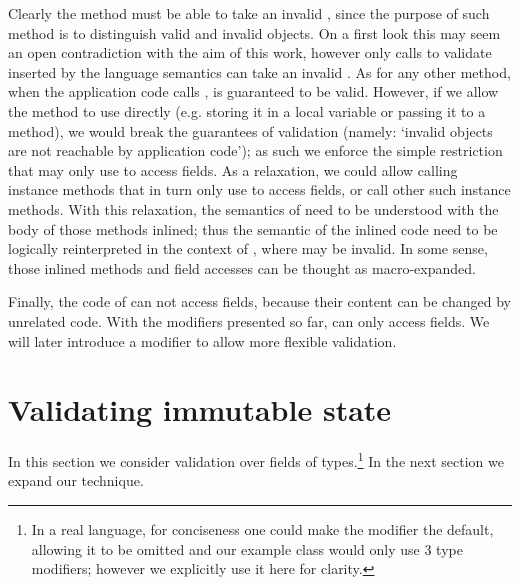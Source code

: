 Clearly the \validate{} method must be able to take an invalid \Q@this@, since the purpose of such method is to distinguish valid and invalid objects.
On a first look this may seem an open contradiction
with the aim of this work, however only calls to validate inserted by the language semantics can take an invalid \Q@this@. As for any other method, when the application code calls \validate,
\Q@this@ is guaranteed to be valid.
However, if we allow the method to use \Q@this@ directly (e.g. storing it in a local variable or passing it to a method), we would break the guarantees of validation (namely: `invalid objects are not reachable by application code'); as such we enforce the simple restriction that \validate{} may only use \Q@this@ to access fields.
As a relaxation, we could allow calling instance methods that in turn only use \Q@this@ to access fields, or call other such instance methods. With this relaxation, the semantics of \validate{} need to be understood with the body of those methods inlined; thus the semantic of the inlined code need to be logically reinterpreted in the context of \validate, where \Q@this@ may be invalid.
In some sense, those inlined methods and field accesses can be thought as macro-expanded.


Finally,
the code of \validate{} can not access  \Q@mut@ fields, because their content can be changed by unrelated code.
With the modifiers presented so far, \validate{} can only access \Q@imm@ fields.
We will later introduce a \Q@capsule@ modifier to allow more flexible validation.



%

\section{Validating immutable state}
\label{s:immState}
In this section we consider validation over fields of \Q@imm@ types.\footnote{
In a real language, for conciseness one could make the \Q@imm@ modifier the default, allowing it to be omitted and our \Q@Person@ example class would only use 3 type modifiers; however we explicitly use it here for clarity.
}
In the next section we expand our technique.

